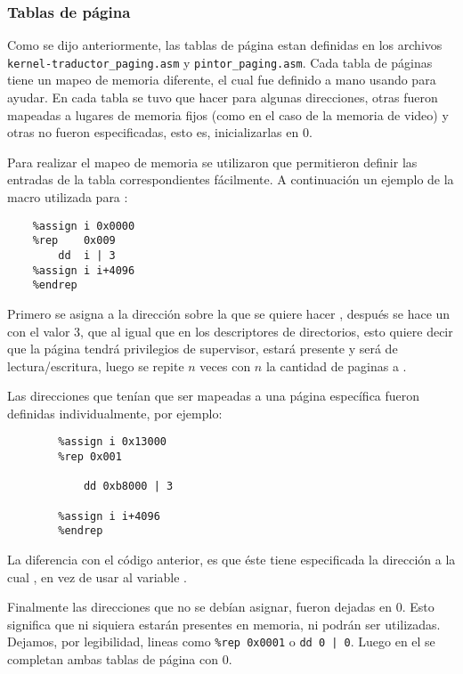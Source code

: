 \subsubsection{Tablas de página} 
	Como se dijo anteriormente, las tablas de página estan definidas en los archivos \verb=kernel-traductor_paging.asm= y \verb=pintor_paging.asm=. Cada 
tabla de páginas tiene un mapeo de memoria diferente, el cual fue definido a mano usando  para ayudar. En cada tabla se tuvo que hacer 
 para algunas direcciones, otras fueron mapeadas a lugares de memoria fijos (como en el caso de la memoria de video) y otras no 
fueron especificadas, esto es, inicializarlas en 0.

	Para realizar el mapeo de memoria se utilizaron  que permitieron definir las entradas de la tabla correspondientes fácilmente. A 
continuación un ejemplo de la macro utilizada para :

\begin{verbatim}
	%assign i 0x0000 
	%rep    0x009 
	    dd 	i | 3 
	%assign i i+4096 
	%endrep 
\end{verbatim}

	Primero se asigna  a la dirección sobre la que se quiere hacer , después se hace un  con el valor 3, que 
al igual que en los descriptores de directorios, esto quiere decir que la página tendrá privilegios de supervisor, estará presente y será de lectura/escritura, 
luego se repite $n$ veces con $n$ la cantidad de paginas a .

    Las direcciones que tenían que ser mapeadas a una página específica fueron definidas individualmente, por ejemplo: 

\begin{verbatim}
		%assign i 0x13000 
		%rep 0x001 

			dd 0xb8000 | 3 

		%assign i i+4096 
		%endrep 
\end{verbatim}

	La diferencia con el código anterior, es que éste tiene especificada la dirección a la cual , en vez de usar al variable . 

    	Finalmente las direcciones que no se debían asignar, fueron dejadas en 0. Esto significa que ni siquiera estarán presentes en memoria, ni podrán 
ser utilizadas. Dejamos, por legibilidad, lineas como \verb=%rep 0x0001= o \verb=dd 0 | 0=. Luego en el  se completan ambas tablas de página con 0. 

